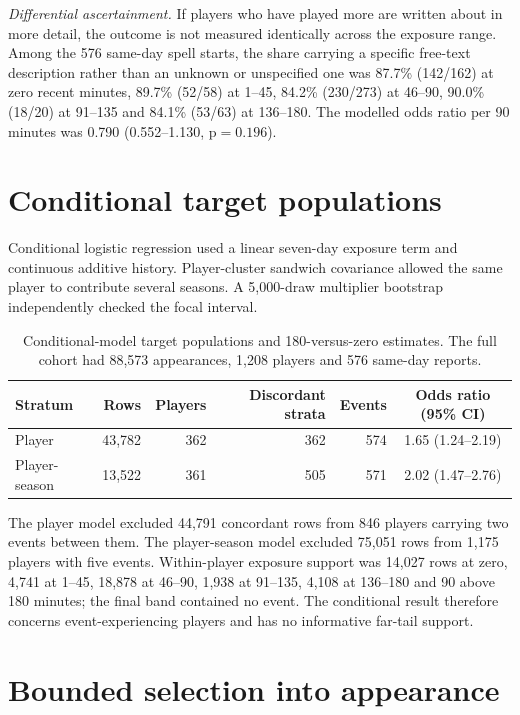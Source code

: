 \documentclass[11pt]{article}
\newcommand{\pval}{\mathrm{p}}
\begin{document}
\emph{Differential ascertainment.} If players who have played more are written about in more detail, the outcome is not measured identically across the exposure range. Among the 576 same-day spell starts, the share carrying a specific free-text description rather than an unknown or unspecified one was 87.7\% (142/162) at zero recent minutes, 89.7\% (52/58) at 1--45, 84.2\% (230/273) at 46--90, 90.0\% (18/20) at 91--135 and 84.1\% (53/63) at 136--180. The modelled odds ratio per 90 minutes was 0.790 (0.552--1.130, $\pval=0.196$).

\section{Conditional target populations}

Conditional logistic regression used a linear seven-day exposure term and continuous additive history. Player-cluster sandwich covariance allowed the same player to contribute several seasons. A 5,000-draw multiplier bootstrap independently checked the focal interval.

\begin{table}[h]
\centering
\caption{Conditional-model target populations and 180-versus-zero estimates. The full cohort had 88,573 appearances, 1,208 players and 576 same-day reports.}
\label{tab:supp_conditional}
\small
\begin{tabular}{lrrrrc}
\toprule
Stratum & Rows & Players & Discordant strata & Events & Odds ratio (95\% CI)\\
\midrule
Player & 43,782 & 362 & 362 & 574 & 1.65 (1.24--2.19)\\
Player-season & 13,522 & 361 & 505 & 571 & 2.02 (1.47--2.76)\\
\bottomrule
\end{tabular}
\end{table}

The player model excluded 44,791 concordant rows from 846 players carrying two events between them. The player-season model excluded 75,051 rows from 1,175 players with five events. Within-player exposure support was 14,027 rows at zero, 4,741 at 1--45, 18,878 at 46--90, 1,938 at 91--135, 4,108 at 136--180 and 90 above 180 minutes; the final band contained no event. The conditional result therefore concerns event-experiencing players and has no informative far-tail support.

\section{Bounded selection into appearance}
\end{document}
